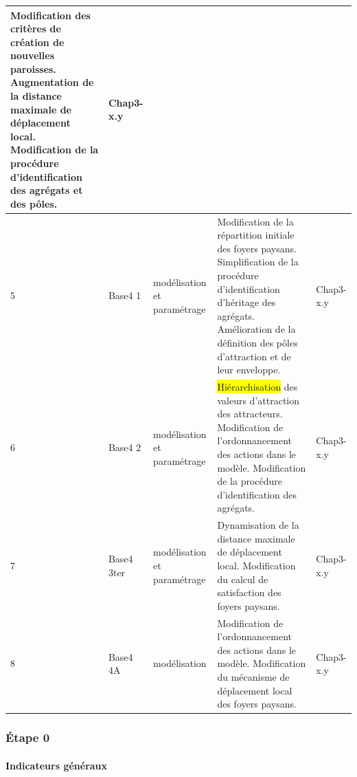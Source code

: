 \begin{footnotesize}
\begin{longtable}{ m{} m{}  m{}  m{}  m{}  }
			Modification des critères de création de nouvelles paroisses. \newline
			Augmentation de la distance maximale de déplacement local. \newline
			Modification de la procédure d'identification des agrégats et des pôles. & Chap3-x.y\\
			\hline
			5 & Base4 1 & modélisation et paramétrage & 
			Modification de la répartition initiale des foyers paysans.\newline
			Simplification de la procédure d'identification d'héritage des agrégats.
			Amélioration de la définition des pôles d'attraction et de leur enveloppe. & Chap3-x.y\\
			\hline
			6 & Base4 2 & modélisation et paramétrage & \colorbox{yellow}{Hiérarchisation} des valeurs d'attraction des attracteurs. \newline
			Modification de l'ordonnancement des actions dans le modèle.\newline
			Modification de la procédure d'identification des agrégats. & Chap3-x.y\\
			\hline
			7 & Base4 3ter & modélisation et paramétrage &
			Dynamisation de la distance maximale de déplacement local.\newline
			Modification du calcul de satisfaction des foyers paysans. & Chap3-x.y\\
			\hline
			8 & Base4 4A & modélisation & Modification de l'ordonnancement des actions dans le modèle.\newline
			Modification du mécanisme de déplacement local des foyers paysans. & Chap3-x.y\\
			\hline
			
		\end{longtable}
	\end{footnotesize}

	\subsubsection{Étape 0}
	
	\paragraph{Indicateurs généraux}
	

